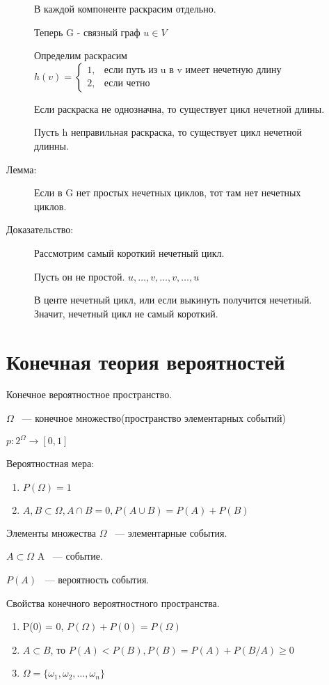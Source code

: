 \documentclass[12pt]{article}
\begin{document}
\begin{description}
\begin{description}
В каждой компоненте раскрасим отдельно. 

Теперь G - связный граф $u \in V$ 

Определим раскрасим $h(v) = \begin{cases} 1, & \text{если путь из u в v имеет нечетную длину}\\
2, &\text{если четно}\end{cases}$

Если раскраска не однозначна, то существует цикл нечетной длины.

Пусть h неправильная раскраска, то существует цикл нечетной длинны. 

\item[Лемма:] Если в G нет простых нечетных циклов, тот там нет нечетных циклов. 

\item[Доказательство:] Рассмотрим самый короткий нечетный цикл. 

Пусть он не простой. $u, \ldots, v, \ldots, v, \ldots, u$

В центе нечетный цикл, или если выкинуть получится нечетный. Значит, нечетный цикл не самый короткий. 
\end{description}

\section{Конечная теория вероятностей}

Конечное вероятностное пространство. 

$\Omega$ ~--- конечное множество(пространство элементарных событий)

$p: 2^{\Omega} \to [0, 1]$

Вероятностная мера:
\begin{enumerate}
\item $P(\Omega) = 1$
\item $A, B \subset \Omega, A \cap B = 0, P(A \cup B) = P(A) + P(B)$
\end{enumerate}

Элементы множества $\Omega$ ~--- элементарные события.

$A \subset \Omega$ A ~--- событие.

$P(A)$ ~--- вероятность события.

Свойства конечного вероятностного пространства. 
\begin{enumerate}
\item P(0) = 0, $P(\Omega) + P(0) = P(\Omega)$
\item $A \subset B$, то $P(A) < P(B), P(B) = P(A) + P(B/A) \ge 0$
\item $\Omega = \{\omega_1, \omega_2, \ldots, \omega_n\}$


\end{enumerate}
\end{description}
\end{document}

